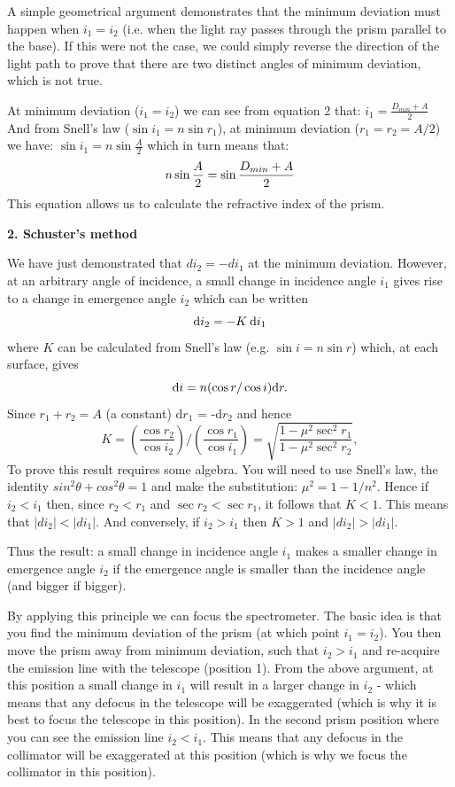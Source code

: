 \documentclass[12pt]{article}
\begin{document}
A simple geometrical argument demonstrates that the minimum deviation must happen when $i_1 = i_2$ (i.e. when the light ray passes through the prism parallel to the base). If this were not the case, we could simply reverse the direction of the light path to prove that there are two distinct angles of minimum deviation, which is not true.

At minimum deviation ($i_1=i_2$) we can see from equation 2 that: $i_1=\frac{D_{min}+A}{2}$\\

And from Snell's law ($\sin i_1=n\sin r_1$), at minimum deviation ($r_1=r_2=A/2$) we have:
$\sin i_1=n\sin\frac{A}{2}$ which in turn means that:
\begin{equation}
{\Large
n\sin\frac{A}{2}=\sin\frac{D_{min}+A}{2}
}
\end{equation}
This equation allows us to calculate the refractive index of the prism.
\newpage
\begin{center}
{\large{\bf 2. Schuster's method}}
\end{center}
We have just demonstrated that $d i_2 = -d i_1$ at the minimum deviation. However, at an arbitrary angle of incidence, a small change in incidence angle $i_1$ gives rise to a change in emergence angle $i_2$ which can be written
\[   \mbox{\rm d}i_2 = - K\:\mbox{\rm d}i_1    \]
where $K$ can be calculated from Snell's law (e.g. $\sin i =n \sin r $) which, at each surface, gives
\[  \mbox{\rm d}i = n (\cos r/\cos i)\mbox{\rm d}r.   \]
Since $r_1 + r_2 = A$ (a constant) d$r_1$ = -d$r_2$ and hence
\[  K = \left(\frac{\cos r_2}{\cos i_2}\right) / 
    \left(\frac{\cos r_1}{\cos i_1}\right)       =
     \sqrt{\frac{1-\mu^2\sec^2 r_1}{1-\mu^2\sec^2 r_2}},  \]
To prove this result requires some algebra. You will need to use Snell's law, the identity $sin^2 \theta + cos^2\theta =1$ and make the substitution: $\mu^2 =  1 - 1/n^2$. Hence if $i_2<i_1$ then, since $r_2<r_1$ and $\sec r_2 <  \sec r_1$, it follows that $K<1$. This means that $|di_2|<|di_1|$. And conversely, if $i_2>i_1$ then $K>1$ and $|di_2|>|di_1|$.

\vspace*{3mm}

{\large Thus the result:  a small change in incidence angle $i_1$ makes a smaller change in emergence angle $i_2$ if the emergence angle is smaller than the incidence angle (and bigger if bigger).}\\

\medskip

\noindent
By applying this principle we can focus the spectrometer. The basic idea is that you find the minimum deviation of the prism (at which point $i_1=i_2$). You then move the prism away from minimum deviation, such that $i_2>i_1$ and re-acquire the emission line with the telescope (position 1). From the above argument, at this position a small change in $i_1$ will result in a larger change in $i_2$ - which means that any defocus in the telescope will be exaggerated (which is why it is best to focus the telescope in this position). In the second prism position where you can see the emission line $i_2<i_1$. This means that any defocus in the collimator will be exaggerated at this position (which is why we focus the collimator in this position).
\end{document}
